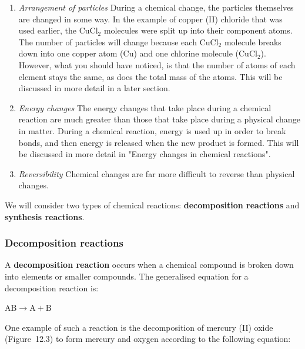       \label{m38709*id62869}\begin{enumerate}[noitemsep, label=\textbf{\arabic*}. ] 
            \label{m38709*uid6}\item \textsl{Arrangement of particles}\newline
During a chemical change, the particles themselves are changed in some way. In the example of copper (II) chloride that was used earlier, the $\mathrm{CuCl}{}_{2}$ molecules were split up into their component atoms. The number of particles will change because each $\mathrm{CuCl}{}_{2}$ molecule breaks down into one copper atom ($\mathrm{Cu}$) and one chlorine molecule ($\mathrm{CuCl}{}_{2}$). However, what you should have noticed, is that the number of atoms of each element stays the same, as does the total mass of the atoms. This will be discussed in more detail in a later section.
\label{m38709*uid7}\item \textsl{Energy changes}\newline
The energy changes that take place during a chemical reaction are much greater than those that take place during a physical change in matter. During a chemical reaction, energy is used up in order to break bonds, and then energy is released when the new product is formed. This will be discussed in more detail in "Energy changes in chemical reactions".
\label{m38709*uid8}\item \textsl{Reversibility}\newline
Chemical changes are far more difficult to reverse than physical changes.
\end{enumerate}
      \label{m38709*id62997}We will consider two types of chemical reactions: \textbf{decomposition reactions} and \textbf{synthesis reactions}.\par 
      \label{m38709*uid9}
            \subsubsection{ Decomposition reactions}
            \nopagebreak
            \label{m38709*id63019}A \textbf{decomposition reaction} occurs when a chemical compound is broken down into elements or smaller compounds. The generalised equation for a decomposition reaction is:\par 
        \label{m38709*id63029}$\mathrm{AB}\to \mathrm{A}+\mathrm{B}$\par 
        \label{m38709*id63040}One example of such a reaction is the decomposition of mercury (II) oxide (Figure~12.3) to form mercury and oxygen according to the following equation:
\label{m38709*id734}\nopagebreak\noindent{}

